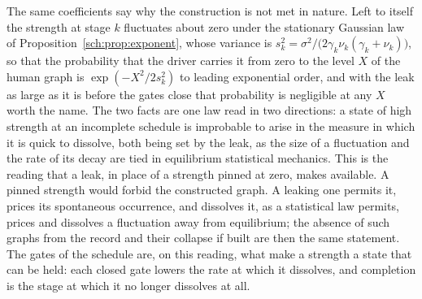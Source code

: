 The same coefficients say why the construction is not met in nature. Left
to itself the strength at stage $k$ fluctuates about zero under the
stationary Gaussian law of Proposition~\ref{sch:prop:exponent}, whose
variance is $s_k^2=\sigma^2/\bigl(2\gamma_k\nu_k(\gamma_k+\nu_k)\bigr)$,
so that the probability that the driver carries it from zero to the level
$X$ of the human graph is $\exp(-X^2/2s_k^2)$ to leading exponential
order, and with the leak as large as it is before the gates close that
probability is negligible at any $X$ worth the name. The two facts are
one law read in two directions: a state of high strength at an incomplete
schedule is improbable to arise in the measure in which it is quick to
dissolve, both being set by the leak, as the size of a fluctuation and
the rate of its decay are tied in equilibrium statistical mechanics. This
is the reading that a leak, in place of a strength pinned at zero, makes
available. A pinned strength would forbid the constructed graph. A
leaking one permits it, prices its spontaneous occurrence, and dissolves
it, as a statistical law permits, prices and dissolves a fluctuation away
from equilibrium; the absence of such graphs from the record and their
collapse if built are then the same statement. The gates of the schedule
are, on this reading, what make a strength a state that can be held: each
closed gate lowers the rate at which it dissolves, and completion is the
stage at which it no longer dissolves at all.

